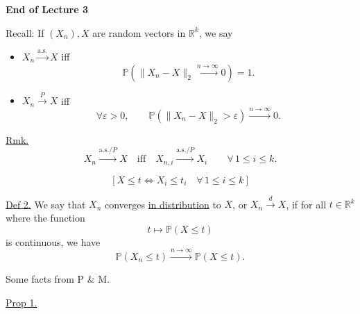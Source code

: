 \documentclass[11pt,a4paper]{article}
\begin{document}
\begin{center}
\textbf{End of Lecture 3}
\end{center}\noindent
Recall: If $(X_n),X$ are random vectors in $\mathbb{R}^k$, we say
\begin{itemize}
    \item
    $X_n \xrightarrow{\mathrm{a.s.}} X$ iff
    \[
    \mathbb{P}\left(
    \|X_n-X\|_2 \xrightarrow{n\to\infty} 0
    \right)=1.
    \]

    \item
    $X_n \xrightarrow{P} X$ iff
    \[
    \forall \varepsilon>0,\qquad
    \mathbb{P}\left(\|X_n-X\|_2>\varepsilon\right)
    \xrightarrow{n\to\infty}0.
    \]
\end{itemize}

\noindent
\underline{Rmk.}
\[
X_n \xrightarrow{\mathrm{a.s.}/P} X
\quad\text{iff}\quad
X_{n,i} \xrightarrow{\mathrm{a.s.}/P} X_i
\qquad \forall\,1\leq i\leq k.
\]

\[
\left[
X\leq t
\iff
X_i\leq t_i
\quad \forall\,1\leq i\leq k
\right]
\]

\noindent
\underline{Def 2.}
We say that $X_n$ converges \underline{in distribution} to $X$,
or $X_n\xrightarrow{d}X$, if for all $t\in\mathbb{R}^k$
where the function
\[
t\mapsto\mathbb{P}(X\leq t)
\]
is continuous, we have
\[
\mathbb{P}(X_n\leq t)
\xrightarrow{n\to\infty}
\mathbb{P}(X\leq t).
\]

\medskip
\noindent
Some facts from P \& M.

\medskip
\noindent
\underline{Prop 1.}
\end{document}
